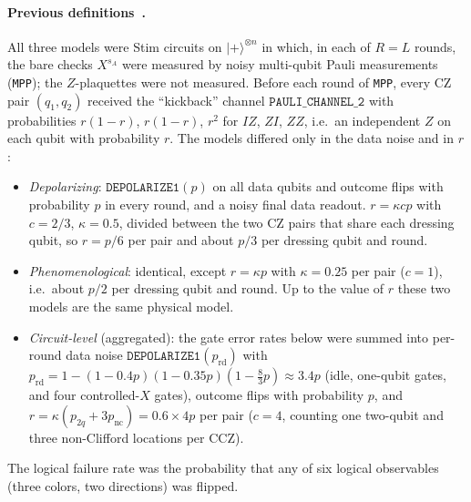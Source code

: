\documentclass[a4paper]{article}
\providecommand{\ket}[1]{\ensuremath{|#1\rangle}}
\begin{document}
\paragraph{Previous definitions~\cite{haga2026aqis}.}
All three models were Stim circuits on $\ket{+}^{\otimes n}$ in which, in each of $R=L$ rounds, the bare checks $X^{s_A}$ were measured by noisy multi-qubit Pauli measurements (\texttt{MPP}); the $Z$-plaquettes were not measured. Before each round of \texttt{MPP}, every CZ pair $(q_1,q_2)$ received the ``kickback'' channel $\mathtt{PAULI\_CHANNEL\_2}$ with probabilities $r(1-r)$, $r(1-r)$, $r^2$ for $IZ$, $ZI$, $ZZ$, i.e.\ an independent $Z$ on each qubit with probability $r$. The models differed only in the data noise and in $r$:
\begin{itemize}[leftmargin=*,itemsep=0pt]
\item \emph{Depolarizing}: $\mathtt{DEPOLARIZE1}(p)$ on all data qubits and outcome flips with probability $p$ in every round, and a noisy final data readout. $r=\kappa cp$ with $c=2/3$, $\kappa=0.5$, divided between the two CZ pairs that share each dressing qubit, so $r=p/6$ per pair and about $p/3$ per dressing qubit and round.
\item \emph{Phenomenological}: identical, except $r=\kappa p$ with $\kappa=0.25$ per pair ($c=1$), i.e.\ about $p/2$ per dressing qubit and round. Up to the value of $r$ these two models are the same physical model.
\item \emph{Circuit-level} (aggregated): the gate error rates below were summed into per-round data noise $\mathtt{DEPOLARIZE1}(p_{\mathrm{rd}})$ with $p_{\mathrm{rd}}=1-(1-0.4p)(1-0.35p)(1-\tfrac83p)\approx3.4p$ (idle, one-qubit gates, and four controlled-$X$ gates), outcome flips with probability $p$, and $r=\kappa(p_{2q}+3p_{\mathrm{nc}})=0.6\times4p$ per pair ($c=4$, counting one two-qubit and three non-Clifford locations per CCZ).
\end{itemize}
The logical failure rate was the probability that any of six logical observables (three colors, two directions) was flipped.
\end{document}
